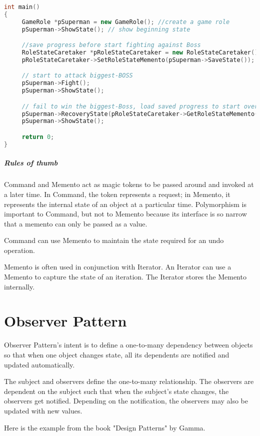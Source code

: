 \documentclass{book}
\begin{document}
\begin{lstlisting}[caption={Memento Pattern example 3}, language=C++]
int main()
{
     GameRole *pSuperman = new GameRole(); //create a game role 
     pSuperman->ShowState(); // show beginning state

     //save progress before start fighting against Boss
     RoleStateCaretaker *pRoleStateCaretaker = new RoleStateCaretaker();
     pRoleStateCaretaker->SetRoleStateMemento(pSuperman->SaveState());

     // start to attack biggest-BOSS
     pSuperman->Fight();
     pSuperman->ShowState();

     // fail to win the biggest-Boss, load saved progress to start over
     pSuperman->RecoveryState(pRoleStateCaretaker->GetRoleStateMemento());
     pSuperman->ShowState();

     return 0;
}
\end{lstlisting}

\paragraph{Rules of thumb}
    Command and Memento act as magic tokens to be passed around and invoked at a later time.
    In Command, the token represents a request; in Memento, it represents the internal state of an object at a particular time.
    Polymorphism is important to Command, but not to Memento because its interface is so narrow that a memento can only be passed as a value.

    Command can use Memento to maintain the state required for an undo operation.

    Memento is often used in conjunction with Iterator. An Iterator can use a Memento to capture the state of an iteration. The Iterator stores the Memento internally.

\chapter{Observer Pattern}\label{ObserverPattern}
Observer Pattern's intent is to define a one-to-many dependency between objects so that when one object changes state, all its dependents are notified and updated automatically.

The subject and observers define the one-to-many relationship.
The observers are dependent on the subject such that when the subject's state changes, the observers get notified.
Depending on the notification, the observers may also be updated with new values.

Here is the example from the book "Design Patterns" by Gamma.
\end{document}
